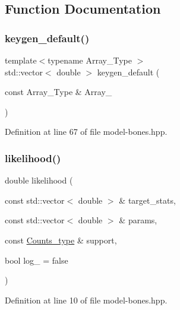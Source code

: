 \subsection{Function Documentation}
\mbox{\label{model-bones_8hpp_ac8a92bc92bfb721602c0470f3efa4f84}} 
\subsubsection{\texorpdfstring{keygen\+\_\+default()}{keygen\_default()}}
{\footnotesize\ttfamily template$<$typename Array\+\_\+\+Type $>$ \\
std\+::vector$<$ double $>$ keygen\+\_\+default (\begin{DoxyParamCaption}\item[{const Array\+\_\+\+Type \&}]{Array\+\_\+ }\end{DoxyParamCaption})\hspace{0.3cm}{\ttfamily [inline]}}



Definition at line 67 of file model-\/bones.\+hpp.

\mbox{\label{model-bones_8hpp_a0fa8078cca870ae78006afe2fe147717}} 
\subsubsection{\texorpdfstring{likelihood()}{likelihood()}}
{\footnotesize\ttfamily double likelihood (\begin{DoxyParamCaption}\item[{const std\+::vector$<$ double $>$ \&}]{target\+\_\+stats,  }\item[{const std\+::vector$<$ double $>$ \&}]{params,  }\item[{const \hyperlink{typedefs_8hpp_aee40fa17c1fddb63dd1f2b1470ade95b}{Counts\+\_\+type} \&}]{support,  }\item[{bool}]{log\+\_\+ = {\ttfamily false} }\end{DoxyParamCaption})\hspace{0.3cm}{\ttfamily [inline]}}



Definition at line 10 of file model-\/bones.\+hpp.

